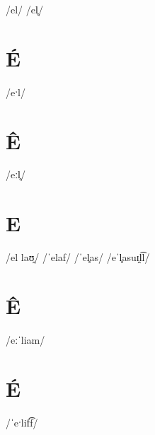 \documentclass[10pt,a4paper,twoside]{book}
\begin{document}
\begin{multicols}{3}
 {/el/} {}
 {/el̥/} {}
\end{multicols}

\section*{É}

\begin{multicols}{3}
 {/eˑl/} {}
\end{multicols}

\section*{Ê}

\begin{multicols}{3}
 {/eːl̥/} {}
\end{multicols}

\section*{E}

\begin{multicols}{3}
 {/el laʊ̯/} {}
 {/ˈelaf/} {}
 {/ˈel̥as/} {}
 {/eˈl̥asuɪ̯l͡l/} {}
\end{multicols}

\section*{Ê}

\begin{multicols}{3}
 {/eːˈliam/} {}
\end{multicols}

\section*{É}

\begin{multicols}{3}
 {/ˈeˑlif͡f/} {}
\end{multicols}
\end{document}
